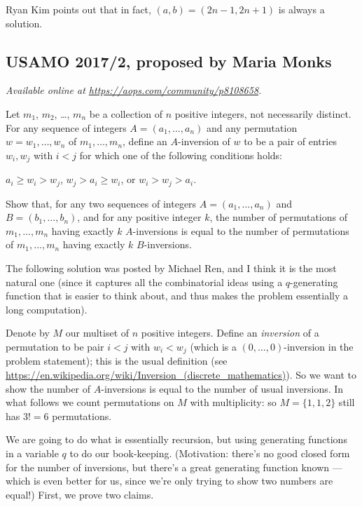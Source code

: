 \documentclass[11pt]{scrartcl}
\begin{document}
\begin{remark*}
  Ryan Kim points out that in fact,
  $(a,b) = (2n-1,2n+1)$ is always a solution.
\end{remark*}
\pagebreak

\subsection{USAMO 2017/2, proposed by Maria Monks}
\textsl{Available online at \url{https://aops.com/community/p8108658}.}
\begin{mdframed}[style=mdpurplebox,frametitle={Problem statement}]
Let $m_1$, $m_2$, \dots, $m_n$ be a collection of $n$ positive integers,
not necessarily distinct.
For any sequence of integers $A = (a_1, \dots, a_n)$
and any permutation $w = w_1, \dots, w_n$ of $m_1, \dots, m_n$,
define an $A$-inversion of $w$ to be a pair of
entries $w_i, w_j$ with $i < j$ for which
one of the following conditions holds:
\begin{itemize}
  \ii $a_i \ge w_i > w_j$,
    \ii $w_j > a_i \ge w_i$, or
    \ii $w_i > w_j > a_i$.
\end{itemize}
Show that, for any two sequences of integers
$A = (a_1, \dots, a_n)$ and $B = (b_1, \dots, b_n)$,
and for any positive integer $k$, the number of permutations
of $m_1, \dots, m_n$ having exactly $k$ $A$-inversions
is equal to the number of permutations of $m_1, \dots, m_n$
having exactly $k$ $B$-inversions.
\end{mdframed}
The following solution was posted by Michael Ren,
and I think it is the most natural one
(since it captures all the combinatorial ideas
using a $q$-generating function that is easier to think about,
and thus makes the problem essentially a long computation).

Denote by $M$ our multiset of $n$ positive integers.
Define an \emph{inversion} of a permutation to be pair $i < j$
with $w_i < w_j$ (which is a $(0,\dots,0)$-inversion in the problem statement);
this is the usual definition
(see \url{https://en.wikipedia.org/wiki/Inversion_(discrete_mathematics)}).
So we want to show the number of $A$-inversions
is equal to the number of usual inversions.
In what follows we count permutations on $M$ with multiplicity:
so $M = \{1,1,2\}$ still has $3!=6$ permutations.

We are going to do what is essentially recursion,
but using generating functions in a variable $q$ to do our book-keeping.
(Motivation: there's no good closed form for the number of inversions,
but there's a great generating function known --- which is even better
for us, since we're only trying to show two numbers are equal!)
First, we prove two claims.
\end{document}
